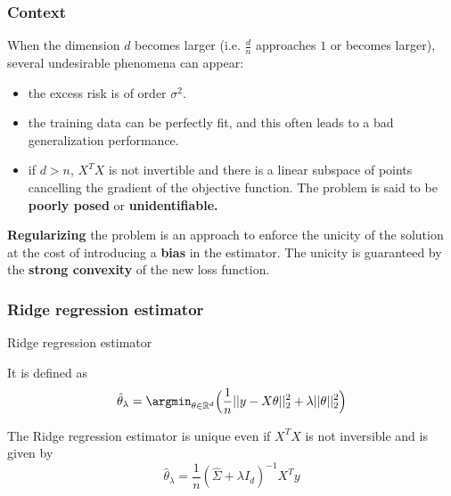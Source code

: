 \documentclass[
10pt, %
a4paper, %
oneside, %
headinclude,footinclude, %
BCOR5mm, %
]{scrartcl}
\begin{document}
\subsubsection{\large\color{Periwinkle}Context}

When the dimension $d$ becomes larger (i.e. $ \frac{d}{n} $ approaches $1$ or becomes larger), several undesirable phenomena can appear:
\begin{itemize}
    \item the excess risk is of order $ \sigma^2$.
    \item the training data can be perfectly fit, and this often leads to a bad generalization performance.
    \item if $d>n$, $X^TX$ is not invertible and there is a linear subspace of points cancelling the gradient of the objective function. The problem is said to be \textbf{{poorly posed}} or \textbf{{unidentifiable.}}
\end{itemize}

\textbf{{Regularizing}} the problem is an approach to enforce the unicity of the solution at the cost of introducing a \textbf{{bias}} in the estimator. The unicity is guaranteed by the \textbf{{strong convexity}} of the new loss function.

\subsubsection{\large\color{Periwinkle}Ridge regression estimator}

\begin{definition}{Ridge regression estimator}

    It is defined as
\begin{equation}
    \label{risk:ridge}
    \hat{ \theta}_{\lambda} = \argmin_{\theta \in \mathbb{R}^d} \Big( \frac{1}{n} ||y-X\theta||_2^2 + \lambda || \theta||_2^2 \Big)
\end{equation}
\end{definition}


\begin{proposition}

    The Ridge regression estimator is unique even if $X^TX$ is not inversible and is given by
    \begin{equation*}
	\hat{ \theta}_{\lambda} = \frac{1}{n} ( \hat{\Sigma} +\lambda I_d)^{-1}X^Ty
    \end{equation*}
\end{proposition}
\end{document}
